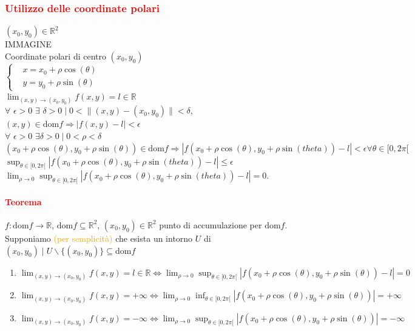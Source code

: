 \documentclass{article}
\newcommand{\R}{\mathbb{R}}
\newcommand{\dom}{\text{dom}}
\begin{document}
\subsubsection{\textcolor{red}{Utilizzo delle coordinate polari}}
$(x_0,y_0)\in \R^2$\\
IMMAGINE\\
Coordinate polari di centro $(x_0,y_0)$\\
$\begin{cases}
    & x=x_0+\rho \cos(\theta)\\
    & y=y_0+\rho \sin(\theta)
\end{cases}$\\
$\lim_{(x,y)\rightarrow(x_0,y_0)}f(x,y)=l\in \R $\\
$\forall\,\, \epsilon >0 \,\, \exists \,\, \delta >0 \mid 0 < \|(x,y)-(x_0,y_0)\|< \delta$, $(x,y)\in \dom f \Rightarrow |f(x,y)-l|< \epsilon$\\
$ \forall \,\, \epsilon >0 \,\, \exists \delta >0 \mid 0<\rho < \delta$\\
$(x_0+\rho \cos(\theta), y_0+\rho \sin(\theta))\in \dom f \Rightarrow |f(x_0+\rho \cos(\theta), y_0+\rho \sin(theta))-l|<\epsilon \forall\theta \in [0,2\pi[$\\
$\sup_{\theta \in [0,2\pi[}|f(x_0+\rho \cos(\theta), y_0+\rho \sin(theta))-l|\leq\epsilon$\\
$\lim_{\rho\rightarrow0}\sup_{\theta \in [0,2\pi[}|f(x_0+\rho \cos(\theta), y_0+\rho \sin(theta))-l|=0$.

\paragraph{\textcolor{red}{Teorema}}
$f:\dom f \rightarrow\R$, $\dom f \subseteq\R^2$, $(x_0,y_0)\in \R^2$ punto di accumulazione per $\dom f$. Supponiamo \textcolor{orange}{(per semplicità)} che esista un intorno $U$ di $(x_0,y_0)\mid U\backslash \{(x_0,y_0)\}\subseteq \dom f$
\begin{enumerate}
    \item $\lim_{(x,y)\rightarrow(x_0,y_0)}f(x,y)=l\in\R \Leftrightarrow \lim_{\rho \rightarrow 0 } \sup_{\theta \in [0,2\pi[}|f(x_0+\rho\cos(\theta),y_0+\rho\sin(\theta))-l|=0$ 
    \item $\lim_{(x,y)\rightarrow(x_0,y_0)}f(x,y)=+\infty \Leftrightarrow \lim_{\rho\rightarrow 0}\inf_{\theta \in[0,2\pi[}|f(x_0+\rho \cos(\theta), y_0+\rho \sin(\theta))|=+\infty$
    \item $\lim_{(x,y)\rightarrow(x_0,y_0)}f(x,y)=-\infty\Leftrightarrow \lim_{\rho\rightarrow 0}\sup_{\theta \in[0,2\pi[}|f(x_0+\rho \cos(\theta), y_0+\rho \sin(\theta))|=-\infty$
\end{enumerate}
\end{document}
